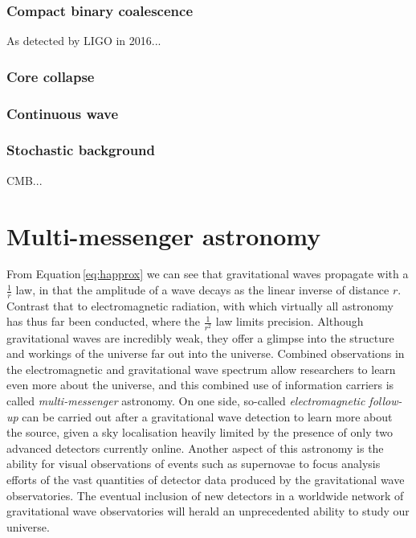 \subsubsection{Compact binary coalescence}
As detected by LIGO in 2016...


\subsubsection{Core collapse}

\subsubsection{Continuous wave}

\subsubsection{Stochastic background}
CMB...

\section{Multi-messenger astronomy}
From Equation\,\ref{eq:happrox} we can see that gravitational waves propagate with a $\frac{1}{r}$ law, in that the amplitude of a wave decays as the linear inverse of distance $r$. Contrast that to electromagnetic radiation, with which virtually all astronomy has thus far been conducted, where the $\frac{1}{r^2}$ law limits precision. Although gravitational waves are incredibly weak, they offer a glimpse into the structure and workings of the universe far out into the universe. Combined observations in the electromagnetic and gravitational wave spectrum allow researchers to learn even more about the universe, and this combined use of information carriers is called \emph{multi-messenger} astronomy. On one side, so-called \emph{electromagnetic follow-up} can be carried out after a gravitational wave detection to learn more about the source, given a sky localisation heavily limited by the presence of only two advanced detectors currently online. Another aspect of this astronomy is the ability for visual observations of events such as supernovae to focus analysis efforts of the vast quantities of detector data produced by the gravitational wave observatories. The eventual inclusion of new detectors in a worldwide network of gravitational wave observatories will herald an unprecedented ability to study our universe.

